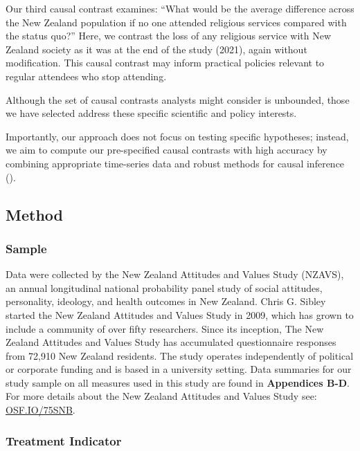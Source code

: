 \documentclass[
  single column]{article}
\begin{document}
Our third causal contrast examines: ``What would be the average
difference across the New Zealand population if no one attended
religious services compared with the status quo?'' Here, we contrast the
loss of any religious service with New Zealand society as it was at the
end of the study (2021), again without modification. This causal
contrast may inform practical policies relevant to regular attendees who
stop attending.

Although the set of causal contrasts analysts might consider is
unbounded, those we have selected address these specific scientific and
policy interests.

Importantly, our approach does not focus on testing specific hypotheses;
instead, we aim to compute our pre-specified causal contrasts with high
accuracy by combining appropriate time-series data and robust methods
for causal inference ().

\subsection{Method}\label{method}

\subsubsection{Sample}\label{sample}

Data were collected by the New Zealand Attitudes and Values Study
(NZAVS), an annual longitudinal national probability panel study of
social attitudes, personality, ideology, and health outcomes in New
Zealand. Chris G. Sibley started the New Zealand Attitudes and Values
Study in 2009, which has grown to include a community of over fifty
researchers. Since its inception, The New Zealand Attitudes and Values
Study has accumulated questionnaire responses from 72,910 New Zealand
residents. The study operates independently of political or corporate
funding and is based in a university setting. Data summaries for our
study sample on all measures used in this study are found in
\textbf{Appendices B-D}. For more details about the New Zealand
Attitudes and Values Study see:
\href{https://doi.org/10.17605/OSF.IO/75SNB}{OSF.IO/75SNB}.

\subsubsection{Treatment Indicator}\label{treatment-indicator}
\end{document}
